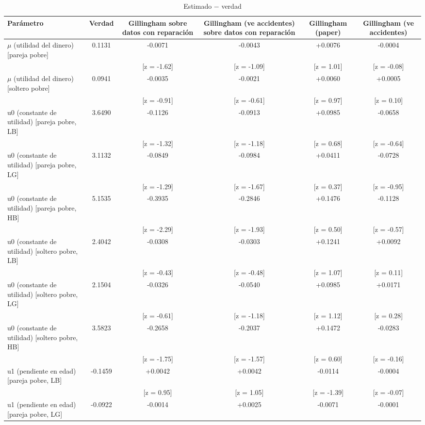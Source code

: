 \begin{table}[htbp]
\centering
\caption{Estimado $-$ verdad}
\begin{tabular}{lccccc}
\toprule
Parámetro & Verdad & Gillingham sobre datos con reparación & Gillingham (ve accidentes) sobre datos con reparación & Gillingham (paper) & Gillingham (ve accidentes) \\
\midrule
$\mu$ (utilidad del dinero) [pareja pobre] & 0.1131 & -0.0071 & -0.0043 & +0.0076 & -0.0004 \\
 &  & [z = -1.62] & [z = -1.09] & [z = 1.01] & [z = -0.08] \\
$\mu$ (utilidad del dinero) [soltero pobre] & 0.0941 & -0.0035 & -0.0021 & +0.0060 & +0.0005 \\
 &  & [z = -0.91] & [z = -0.61] & [z = 0.97] & [z = 0.10] \\
u0 (constante de utilidad) [pareja pobre, LB] & 3.6490 & -0.1126 & -0.0913 & +0.0985 & -0.0658 \\
 &  & [z = -1.32] & [z = -1.18] & [z = 0.68] & [z = -0.64] \\
u0 (constante de utilidad) [pareja pobre, LG] & 3.1132 & -0.0849 & -0.0984 & +0.0411 & -0.0728 \\
 &  & [z = -1.29] & [z = -1.67] & [z = 0.37] & [z = -0.95] \\
u0 (constante de utilidad) [pareja pobre, HB] & 5.1535 & -0.3935 & -0.2846 & +0.1476 & -0.1128 \\
 &  & [z = -2.29] & [z = -1.93] & [z = 0.50] & [z = -0.57] \\
u0 (constante de utilidad) [soltero pobre, LB] & 2.4042 & -0.0308 & -0.0303 & +0.1241 & +0.0092 \\
 &  & [z = -0.43] & [z = -0.48] & [z = 1.07] & [z = 0.11] \\
u0 (constante de utilidad) [soltero pobre, LG] & 2.1504 & -0.0326 & -0.0540 & +0.0985 & +0.0171 \\
 &  & [z = -0.61] & [z = -1.18] & [z = 1.12] & [z = 0.28] \\
u0 (constante de utilidad) [soltero pobre, HB] & 3.5823 & -0.2658 & -0.2037 & +0.1472 & -0.0283 \\
 &  & [z = -1.75] & [z = -1.57] & [z = 0.60] & [z = -0.16] \\
u1 (pendiente en edad) [pareja pobre, LB] & -0.1459 & +0.0042 & +0.0042 & -0.0114 & -0.0004 \\
 &  & [z = 0.95] & [z = 1.05] & [z = -1.39] & [z = -0.07] \\
u1 (pendiente en edad) [pareja pobre, LG] & -0.0922 & -0.0014 & +0.0025 & -0.0071 & -0.0001 \\

\end{tabular}
\end{table}

